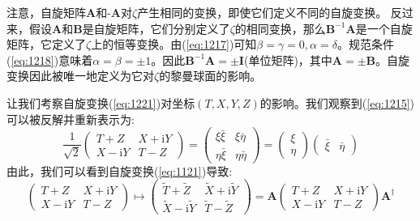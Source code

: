 \documentclass[utf8]{ctexbook}
\numberwithin{equation}{section}
\begin{document}
注意，自旋矩阵$\mathbf{A}$和-$\mathbf{A}$对$\zeta$产生相同的变换，即使它们定义不同的自旋变换。
反过来，假设$\mathbf{A}$和$\mathbf{B}$是自旋矩阵，它们分别定义了$\zeta$的相同变换，那么$\mathbf{B}^{-1}\mathbf{A}$是一个自旋矩阵，它定义了$\zeta$上的恒等变换。由(\ref{eq:1217})可知$\beta=\gamma=0, \alpha=\delta$。规范条件(\ref{eq:1218})意味着$\alpha=\beta= \pm 1$。因此$\mathbf{B}^{-1}\mathbf{A}=±\mathbf{I}$(单位矩阵)，其中$\mathbf{A}=\pm \mathbf{B}$。自旋变换因此被唯一地定义为它对$\zeta$的黎曼球面的影响。

让我们考察自旋变换(\ref{eq:1221})对坐标$(T, X, Y, Z)$的影响。我们观察到(\ref{eq:1215})可以被反解并重新表示为:
\begin{equation}
    \frac{1}{\sqrt{2}}
    \begin{pmatrix}
        T+Z&X+\mathrm{i}Y\\
        X-\mathrm{i}Y&T-Z
    \end{pmatrix}=
    \begin{pmatrix}
        \xi\bar{\xi}&\xi\bar{\eta}\\
        \eta\bar{\xi}&\eta\bar{\eta}
    \end{pmatrix}=
    \begin{pmatrix}
        \xi\\
        \eta
    \end{pmatrix}\begin{pmatrix}
        \bar{\xi}&\bar{\eta}
    \end{pmatrix}
\end{equation}
由此，我们可以看到自旋变换(\ref{eq:1121})导致:
\begin{equation}
    \begin{pmatrix}
        T+Z&X+\mathrm{i}Y\\
        X-\mathrm{i}Y&T-Z
    \end{pmatrix}\mapsto\begin{pmatrix}
        \tilde{T}+\tilde{Z}&\tilde{X}+\mathrm{i}\tilde{Y}\\
        \tilde{X}-\mathrm{i}\tilde{Y}&\tilde{T}-\tilde{Z}
    \end{pmatrix}=\mathbf{A}\begin{pmatrix}
        T+Z&X+\mathrm{i}Y\\
        X-\mathrm{i}Y&T-Z
    \end{pmatrix}\mathbf{A}^\dagger \label{eq:1224}
\end{equation}
\end{document}
